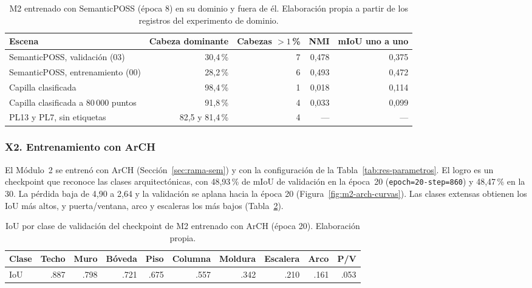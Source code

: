 \begin{table}[!htbp]
\centering
{}\small
\setlength{\tabcolsep}{4pt}
\caption[Control positivo del M2 entrenado con SemanticPOSS]{M2 entrenado con SemanticPOSS (época 8) en su dominio y fuera de él. Elaboración propia a partir de los registros del experimento de dominio.}
\label{tab:m2-control}
\begin{tabularx}{\linewidth}{@{}>{\raggedright\arraybackslash}Xrrrr@{}}
\toprule
\textbf{Escena} & \textbf{Cabeza dominante} & \textbf{Cabezas $>1$\,\%} & \textbf{NMI} & \textbf{mIoU uno a uno} \\
\midrule
SemanticPOSS, validación (03) & 30{,}4\,\% & 7 & 0{,}478 & 0{,}375 \\
SemanticPOSS, entrenamiento (00) & 28{,}2\,\% & 6 & 0{,}493 & 0{,}472 \\
Capilla clasificada & 98{,}4\,\% & 1 & 0{,}018 & 0{,}114 \\
Capilla clasificada a 80\,000 puntos & 91{,}8\,\% & 4 & 0{,}033 & 0{,}099 \\
PL13 y PL7, sin etiquetas & 82{,}5 y 81{,}4\,\% & 4 & --- & --- \\
\bottomrule
\end{tabularx}
\end{table}

\subsubsection*{X2. Entrenamiento con ArCH}

El Módulo~2 se entrenó con ArCH \cite{matrone2020benchmark} (Sección~\ref{sec:rama-sem}) y con
la configuración de la Tabla~\ref{tab:res-parametros}. El logro es un checkpoint que
reconoce las clases arquitectónicas, con 48{,}93\,\% de mIoU de validación en la época~20
(\texttt{epoch=20-step=860}) y 48{,}47\,\% en la 30. La pérdida baja de 4{,}90 a 2{,}64 y la
validación se aplana hacia la época 20 (Figura~\ref{fig:m2-arch-curvas}). Las clases
extensas obtienen los IoU más altos, y puerta/ventana, arco y escaleras los más bajos
(Tabla~\ref{tab:m2-arch-clases}).

\begin{table}[!htbp]
\centering
\small
\caption[IoU por clase del entrenamiento de M2 con ArCH]{IoU por clase de validación del checkpoint de M2 entrenado con ArCH (época 20). Elaboración propia.}
\label{tab:m2-arch-clases}
\begin{tabular}{lrrrrrrrrr}
\toprule
Clase & Techo & Muro & Bóveda & Piso & Columna & Moldura & Escalera & Arco & P/V \\
\midrule
IoU & .887 & .798 & .721 & .675 & .557 & .342 & .210 & .161 & .053 \\
\bottomrule
\end{tabular}
\end{table}

